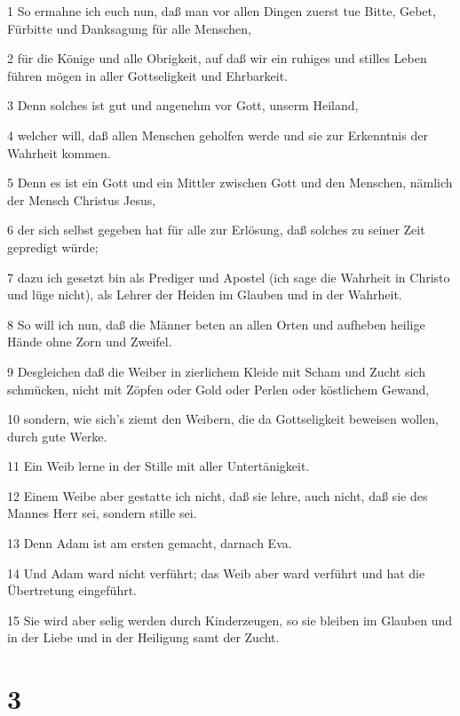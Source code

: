 \par 1 So ermahne ich euch nun, daß man vor allen Dingen zuerst tue Bitte, Gebet, Fürbitte und Danksagung für alle Menschen,
\par 2 für die Könige und alle Obrigkeit, auf daß wir ein ruhiges und stilles Leben führen mögen in aller Gottseligkeit und Ehrbarkeit.
\par 3 Denn solches ist gut und angenehm vor Gott, unserm Heiland,
\par 4 welcher will, daß allen Menschen geholfen werde und sie zur Erkenntnis der Wahrheit kommen.
\par 5 Denn es ist ein Gott und ein Mittler zwischen Gott und den Menschen, nämlich der Mensch Christus Jesus,
\par 6 der sich selbst gegeben hat für alle zur Erlösung, daß solches zu seiner Zeit gepredigt würde;
\par 7 dazu ich gesetzt bin als Prediger und Apostel (ich sage die Wahrheit in Christo und lüge nicht), als Lehrer der Heiden im Glauben und in der Wahrheit.
\par 8 So will ich nun, daß die Männer beten an allen Orten und aufheben heilige Hände ohne Zorn und Zweifel.
\par 9 Desgleichen daß die Weiber in zierlichem Kleide mit Scham und Zucht sich schmücken, nicht mit Zöpfen oder Gold oder Perlen oder köstlichem Gewand,
\par 10 sondern, wie sich's ziemt den Weibern, die da Gottseligkeit beweisen wollen, durch gute Werke.
\par 11 Ein Weib lerne in der Stille mit aller Untertänigkeit.
\par 12 Einem Weibe aber gestatte ich nicht, daß sie lehre, auch nicht, daß sie des Mannes Herr sei, sondern stille sei.
\par 13 Denn Adam ist am ersten gemacht, darnach Eva.
\par 14 Und Adam ward nicht verführt; das Weib aber ward verführt und hat die Übertretung eingeführt.
\par 15 Sie wird aber selig werden durch Kinderzeugen, so sie bleiben im Glauben und in der Liebe und in der Heiligung samt der Zucht.

\chapter{3}

